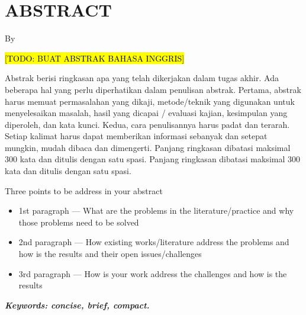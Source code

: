 \clearpage
\chapter*{ABSTRACT}

\begin{center}
  \center
  \large \bfseries \MakeUppercase{\thetitle}

  \normalfont\normalsize
  By

  \theauthor
\end{center}

\vspace{1cm}

\begin{singlespace}
  \hl{[TODO: BUAT ABSTRAK BAHASA INGGRIS]}

  Abstrak berisi ringkasan apa yang telah dikerjakan dalam tugas akhir. Ada beberapa hal yang perlu diperhatikan dalam penulisan abstrak. Pertama, abstrak harus memuat permasalahan yang dikaji, metode/teknik yang digunakan untuk menyelesaikan masalah, hasil yang dicapai / evaluasi kajian, kesimpulan yang diperoleh, dan kata kunci.  Kedua, cara penulisannya harus padat dan terarah. Setiap kalimat harus dapat memberikan informasi sebanyak dan setepat mungkin, mudah dibaca dan dimengerti. Panjang ringkasan dibatasi maksimal 300 kata dan ditulis dengan satu spasi. Panjang ringkasan dibatasi maksimal 300 kata dan ditulis dengan satu spasi.

  Three points to be address in your abstract

  \begin{itemize}
    \item 1st paragraph — What are the problems in the literature/practice and why those problems need to be solved

    \item 2nd paragraph — How existing works/literature address the problems and how is the results and their open issues/challenges

    \item 3rd paragraph — How is your work address the challenges and how is the results
  \end{itemize}

\end{singlespace}

\textbf{\textit{Keywords: concise, brief, compact.}}
\clearpage
